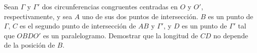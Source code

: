 Sean $\Gamma$ y $\Gamma'$ dos circunferencias congruentes centradas en $O$ y $O'$, respectivamente, y sea $A$ uno de sus dos puntos de intersección. $B$ es un punto de $\Gamma$, $C$ es el segundo punto de intersección de $AB$ y $\Gamma'$, y $D$ es un punto de $\Gamma'$ tal que $OBDO'$ es un paralelogramo. Demostrar que la longitud de $CD$ no depende de la posición de $B$.
